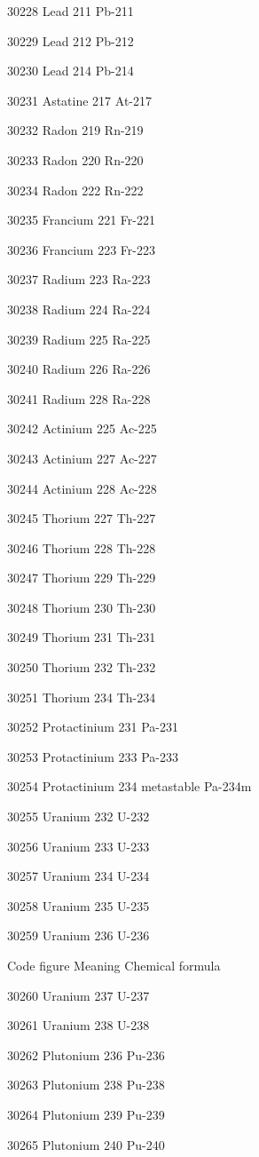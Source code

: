 30228 Lead 211 Pb-211

30229 Lead 212 Pb-212

30230 Lead 214 Pb-214

30231 Astatine 217 At-217

30232 Radon 219 Rn-219

30233 Radon 220 Rn-220

30234 Radon 222 Rn-222

30235 Francium 221 Fr-221

30236 Francium 223 Fr-223

30237 Radium 223 Ra-223

30238 Radium 224 Ra-224

30239 Radium 225 Ra-225

30240 Radium 226 Ra-226

30241 Radium 228 Ra-228

30242 Actinium 225 Ac-225

30243 Actinium 227 Ac-227

30244 Actinium 228 Ac-228

30245 Thorium 227 Th-227

30246 Thorium 228 Th-228

30247 Thorium 229 Th-229

30248 Thorium 230 Th-230

30249 Thorium 231 Th-231

30250 Thorium 232 Th-232

30251 Thorium 234 Th-234

30252 Protactinium 231 Pa-231

30253 Protactinium 233 Pa-233

30254 Protactinium 234 metastable Pa-234m

30255 Uranium 232 U-232

30256 Uranium 233 U-233

30257 Uranium 234 U-234

30258 Uranium 235 U-235

30259 Uranium 236 U-236

Code figure Meaning Chemical formula

30260 Uranium 237 U-237

30261 Uranium 238 U-238

30262 Plutonium 236 Pu-236

30263 Plutonium 238 Pu-238

30264 Plutonium 239 Pu-239

30265 Plutonium 240 Pu-240

